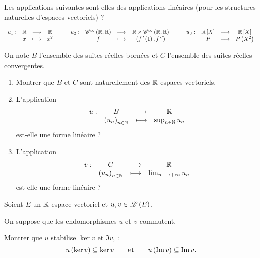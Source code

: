 \begin{exo}
Les applications suivantes sont-elles des applications linéaires (pour les structures naturelles d'espaces vectoriels) ?

\[\fonction{u_1}{\R}{\R}{x}{x^2}\qquad\fonction{u_2}{\ensclasse{\infty}{\R}{\R}}{\R\times\ensclasse{\infty}{\R}{\R}}{f}{\paren{f\prim\paren{1},f\seconde}}\qquad\fonction{u_3}{\poly[\R]}{\poly[\R]}{P}{P\paren{X^2}}\]
\end{exo}

\begin{corr}
\end{corr}

\begin{exo}
On note \(B\) l'ensemble des suites réelles bornées et \(C\) l'ensemble des suites réelles convergentes.

\begin{enumerate}
\item Montrer que \(B\) et \(C\) sont naturellement des \(\mathbb{R}\)-espaces vectoriels. \\

\item L'application \[\begin{array}[t]{cccc}u : & B & \longrightarrow & \mathbb{R} \\ & \left(u_n\right)_{n\in\mathbb{N}} & \longmapsto & \sup_{n\in\mathbb{N}}u_n\end{array}\] est-elle une forme linéaire ? \\

\item L'application \[\begin{array}[t]{cccc}v : & C & \longrightarrow & \mathbb{R} \\ & \left(u_n\right)_{n\in\mathbb{N}} & \longmapsto & \lim_{n\longrightarrow+\infty}u_n\end{array}\] est-elle une forme linéaire ?
\end{enumerate}
\end{exo}

\begin{corr}
\end{corr}

\begin{exo}
Soient \(E\) un \(\mathbb{K}\)-espace vectoriel et \(u,v\in\mathscr{L}\left(E\right)\).

On suppose que les endomorphismes \(u\) et \(v\) commutent.

Montrer que \(u\) stabilise \(\ker v\) et \(\Im v\), \cad : \[u\left(\ker v\right)\subseteq\ker v\qquad\text{et}\qquad u\left(\operatorname{Im} v\right)\subseteq\operatorname{Im} v.\]
\end{exo}

\begin{corr}
\end{corr}

